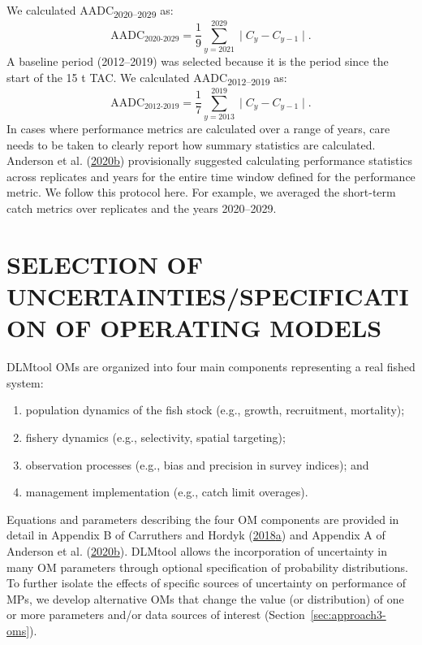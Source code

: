 \documentclass[11pt]{book}
\begin{document}
We calculated AADC\textsubscript{2020--2029} as:
\begin{equation}
\textrm{AADC}_\textrm{2020-2029} = \dfrac{1}{9}\sum_{y=2021}^{2029} \mid C_y - C_{y-1} \mid.
\end{equation}
A baseline period (2012--2019) was selected because it is the period since the start of the 15 t TAC. We calculated AADC\textsubscript{2012--2019} as:
\begin{equation}
\textrm{AADC}_\textrm{2012-2019} = \dfrac{1}{7}\sum_{y=2013}^{2019} \mid C_y - C_{y-1} \mid.
\end{equation}
In cases where performance metrics are calculated over a range of years, care needs to be taken to clearly report how summary statistics are calculated. Anderson et al. (\protect\hyperlink{ref-anderson2020gfmp}{2020}\protect\hyperlink{ref-anderson2020gfmp}{b}) provisionally suggested calculating performance statistics across replicates and years for the entire time window defined for the performance metric. We follow this protocol here. For example, we averaged the short-term catch metrics over replicates and the years 2020--2029.

\hypertarget{sec:om}{%
\section{SELECTION OF UNCERTAINTIES/SPECIFICATION OF OPERATING MODELS}\label{sec:om}}

DLMtool OMs are organized into four main components representing a real fished system:
\begin{enumerate}
\def\labelenumi{\arabic{enumi}.}

\item
  population dynamics of the fish stock (e.g., growth, recruitment, mortality);
\item
  fishery dynamics (e.g., selectivity, spatial targeting);
\item
  observation processes (e.g., bias and precision in survey indices); and
\item
  management implementation (e.g., catch limit overages).
\end{enumerate}
Equations and parameters describing the four OM components are provided in detail in Appendix B of Carruthers and Hordyk (\protect\hyperlink{ref-carruthers2018}{2018}\protect\hyperlink{ref-carruthers2018}{a}) and Appendix A of Anderson et al. (\protect\hyperlink{ref-anderson2020gfmp}{2020}\protect\hyperlink{ref-anderson2020gfmp}{b}). DLMtool allows the incorporation of uncertainty in many OM parameters through optional specification of probability distributions. To further isolate the effects of specific sources of uncertainty on performance of MPs, we develop alternative OMs that change the value (or distribution) of one or more parameters and/or data sources of interest (Section~\ref{sec:approach3-oms}).
\end{document}
